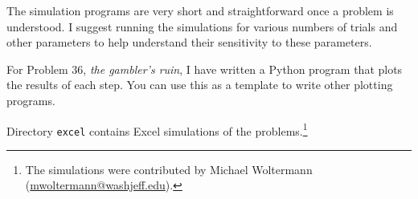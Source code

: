 The simulation programs are very short and straightforward once a problem is understood. I suggest running the simulations for various numbers of trials and other parameters to help understand their sensitivity to these parameters.

For Problem 36, \textit{the gambler's ruin}, I have written a Python program that plots the results of each step. You can use this as a template to write other plotting programs.

Directory \verb+excel+ contains Excel simulations of the problems.\footnote{The simulations were contributed by Michael Woltermann (\url{mwoltermann@washjeff.edu}).}
